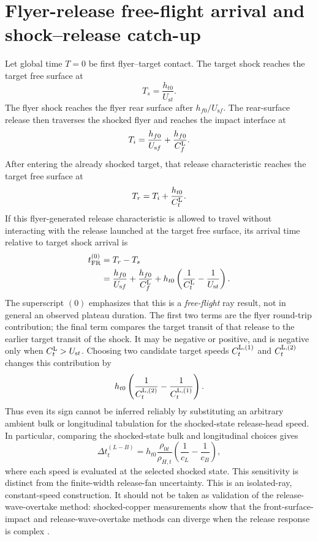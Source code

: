 \documentclass[11pt]{article}
\newcommand{\rhoz}[1][]{\rho_{0#1}}
\newcommand{\Us}[1][]{U_{\mathrm{s}#1}}
\newcommand{\tFR}{t_{\mathrm{FR}}^{(0)}}
\begin{document}
\section{Flyer-release free-flight arrival and shock--release catch-up}

Let global time $T=0$ be first flyer--target contact.  The target shock reaches
the target free surface at
\begin{equation}
  T_s=\frac{h_{t0}}{\Us[t]}.
  \label{eq:shock-arrival-fs}
\end{equation}
The flyer shock reaches the flyer rear surface after $h_{f0}/\Us[f]$.  The
rear-surface release then traverses the shocked flyer and reaches the impact
interface at
\begin{equation}
  T_i=\frac{h_{f0}}{\Us[f]}+\frac{h_{f0}}{\CL[f]}.
  \label{eq:flyer-release-interface}
\end{equation}
After entering the already shocked target, that release characteristic reaches
the target free surface at
\begin{equation}
  T_r=T_i+\frac{h_{t0}}{\CL[t]}.
  \label{eq:release-arrival-fs}
\end{equation}
If this flyer-generated release characteristic is allowed to travel without
interacting with the release launched at the target free surface, its arrival
time relative to target shock arrival is
\begin{align}
  \tFR
  &=T_r-T_s \notag\\
  &=\frac{h_{f0}}{\Us[f]}+\frac{h_{f0}}{\CL[f]}
    +h_{t0}\left(\frac{1}{\CL[t]}-\frac{1}{\Us[t]}\right).
  \label{eq:flyer-release-free-flight}
\end{align}
The superscript $(0)$ emphasizes that this is a \emph{free-flight} ray result,
not in general an observed plateau duration.  The first two terms are the
flyer round-trip contribution; the final term compares the target transit of
that release to the earlier target transit of the shock.  It may be negative or
positive, and is negative only when $\CL[t]>\Us[t]$.  Choosing two candidate
target speeds $\CLv[t]{1}$ and $\CLv[t]{2}$ changes this contribution by
\begin{equation}
  h_{t0}\left(\frac{1}{\CLv[t]{2}}-
                \frac{1}{\CLv[t]{1}}\right).
  \label{eq:target-speed-timing-spread}
\end{equation}
Thus even its sign cannot be inferred reliably by substituting an arbitrary
ambient bulk or longitudinal tabulation for the shocked-state release-head
speed.  In particular, comparing the shocked-state bulk and longitudinal
choices gives
\begin{equation}
  \Delta t_t^{(L-B)}=
  h_{t0}\frac{\rhoz[t]}{\rho_{H,t}}
  \left(\frac{1}{c_L}-\frac{1}{c_B}\right),
  \label{eq:longitudinal-bulk-timing-spread}
\end{equation}
where each speed is evaluated at the selected shocked state.  This sensitivity
is distinct from the finite-width release-fan uncertainty.  This is an isolated-ray,
constant-speed construction.  It should not be taken as validation of the
release-wave-overtake method: shocked-copper measurements show that the
front-surface-impact and release-wave-overtake methods can diverge when the
release response is complex \cite{Hawreliak2024}.
\end{document}

